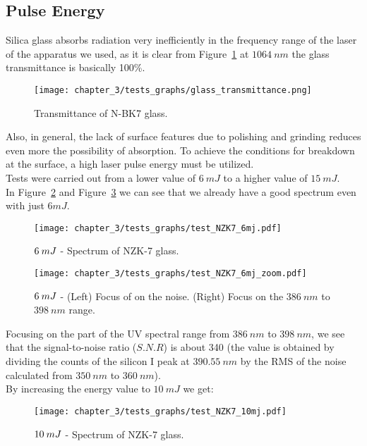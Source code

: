 \subsection{Pulse Energy}
\label{subsec:pulse_energy}
Silica glass absorbs radiation very inefficiently in the frequency range of the laser of the apparatus we used, as it is clear from Figure~\ref{fig:glass_transmittance} at $1064 \: nm$ the glass transmittance is basically 100\%. 
\begin{figure}[H]
    \centering
    \texttt{[image: chapter\_3/tests\_graphs/glass\_transmittance.png]} 
    \caption{Transmittance of N-BK7 glass.}
    \label{fig:glass_transmittance}
 \end{figure}
 Also, in general, the lack of surface features due to polishing and grinding reduces even more the possibility of absorption. To achieve the conditions for breakdown at the surface, a high laser pulse energy must be utilized.
 \\
Tests were carried out from a lower value of $6 \:mJ$ to a higher value of $15\: mJ$.
\\
In Figure~\ref{fig:test_NZK7_6mj} and Figure~\ref{fig:test_NZK7_6mj_zoom} we can see that we already have a good spectrum even with just $6 mJ$.
\begin{figure}[H]
    \centering
    \texttt{[image: chapter\_3/tests\_graphs/test\_NZK7\_6mj.pdf]} 
     \vspace*{-30pt}
    \caption{$\protect 6 \: mJ$ - Spectrum of NZK-7 glass.}
    \label{fig:test_NZK7_6mj}
\end{figure}
\begin{figure}[H]
    \centering
    \texttt{[image: chapter\_3/tests\_graphs/test\_NZK7\_6mj\_zoom.pdf]} 
     \vspace*{-30pt}
    \caption{$\protect 6 \: mJ$ - (Left) Focus of on the noise. (Right) Focus on the $386 \: nm$ to $398 \: nm$ range.}
    \label{fig:test_NZK7_6mj_zoom}
 \end{figure}
Focusing on the part of the UV spectral range from $386 \: nm$ to $398 \: nm$, we see that the signal-to-noise ratio ($S.N.R$) is about 340 (the value is obtained by dividing the counts of the silicon I peak at $390.55 \: nm$ by the RMS of the noise calculated from $350 \: nm$ to $360 \: nm$).
\\
By increasing the energy value to $10 \: mJ$ we get:
\begin{figure}[H]
    \centering
    \texttt{[image: chapter\_3/tests\_graphs/test\_NZK7\_10mj.pdf]} 
     \vspace*{-30pt}
    \caption{$\protect 10 \: mJ$ - Spectrum of NZK-7 glass.}
    \label{fig:test_NZK7_10mj}
\end{figure}
